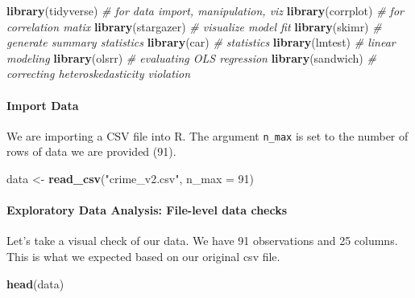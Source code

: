 \documentclass[]{article}
\newenvironment{Shaded}{\begin{snugshade}}{\end{snugshade}}
\newcommand{\CommentTok}[1]{\textcolor[rgb]{0.56,0.35,0.01}{\textit{#1}}}
\newcommand{\DataTypeTok}[1]{\textcolor[rgb]{0.13,0.29,0.53}{#1}}
\newcommand{\DecValTok}[1]{\textcolor[rgb]{0.00,0.00,0.81}{#1}}
\newcommand{\KeywordTok}[1]{\textcolor[rgb]{0.13,0.29,0.53}{\textbf{#1}}}
\newcommand{\NormalTok}[1]{#1}
\newcommand{\StringTok}[1]{\textcolor[rgb]{0.31,0.60,0.02}{#1}}
\let\oldparagraph\paragraph
\renewcommand{\paragraph}[1]{\oldparagraph{#1}\mbox{}}
\begin{document}
\begin{Shaded}
\begin{Highlighting}[]
\KeywordTok{library}\NormalTok{(tidyverse) }\CommentTok{# for data import, manipulation, viz}
\KeywordTok{library}\NormalTok{(corrplot) }\CommentTok{# for correlation matix}
\KeywordTok{library}\NormalTok{(stargazer) }\CommentTok{# visualize model fit}
\KeywordTok{library}\NormalTok{(skimr) }\CommentTok{# generate summary statistics}
\KeywordTok{library}\NormalTok{(car) }\CommentTok{# statistics }
\KeywordTok{library}\NormalTok{(lmtest) }\CommentTok{# linear modeling}
\KeywordTok{library}\NormalTok{(olsrr) }\CommentTok{# evaluating OLS regression }
\KeywordTok{library}\NormalTok{(sandwich) }\CommentTok{# correcting heteroskedasticity violation}
\end{Highlighting}
\end{Shaded}

\hypertarget{import-data}{%
\paragraph{Import Data}\label{import-data}}

We are importing a CSV file into R. The argument \texttt{n\_max} is set
to the number of rows of data we are provided (91).

\begin{Shaded}
\begin{Highlighting}[]
\NormalTok{data <-}\StringTok{ }\KeywordTok{read_csv}\NormalTok{(}\StringTok{"crime_v2.csv"}\NormalTok{, }\DataTypeTok{n_max =} \DecValTok{91}\NormalTok{)}
\end{Highlighting}
\end{Shaded}

\hypertarget{exploratory-data-analysis-file-level-data-checks}{%
\paragraph{Exploratory Data Analysis: File-level data
checks}\label{exploratory-data-analysis-file-level-data-checks}}

Let's take a visual check of our data. We have 91 observations and 25
columns. This is what we expected based on our original csv file.

\begin{Shaded}
\begin{Highlighting}[]
\KeywordTok{head}\NormalTok{(data)}
\end{Highlighting}
\end{Shaded}
\end{document}
